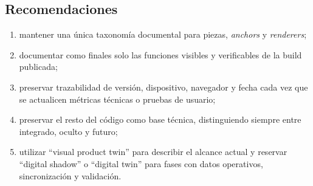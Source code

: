 \subsection{Recomendaciones}

\begin{enumerate}
    \item mantener una única taxonomía documental para piezas, \textit{anchors} y \textit{renderers};
    \item documentar como finales solo las funciones visibles y verificables de la build publicada;
    \item preservar trazabilidad de versión, dispositivo, navegador y fecha cada vez que se actualicen métricas técnicas o pruebas de usuario;
    \item preservar el resto del código como base técnica, distinguiendo siempre entre integrado, oculto y futuro;
    \item utilizar ``visual product twin'' para describir el alcance actual y reservar ``digital shadow'' o ``digital twin'' para fases con datos operativos, sincronización y validación.
\end{enumerate}

\newpage
